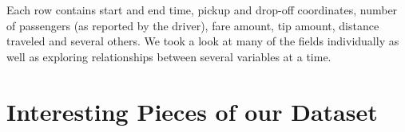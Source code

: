 \documentclass{article}
\begin{document}
Each row contains start and end time, pickup and drop-off coordinates, number of passengers (as reported by the driver), fare amount, tip amount, distance traveled and several others. We took a look at many of the fields individually as well as exploring relationships between several variables at a time.


\section{Interesting Pieces of our Dataset}

\vfill

\medskip


\end{document}
